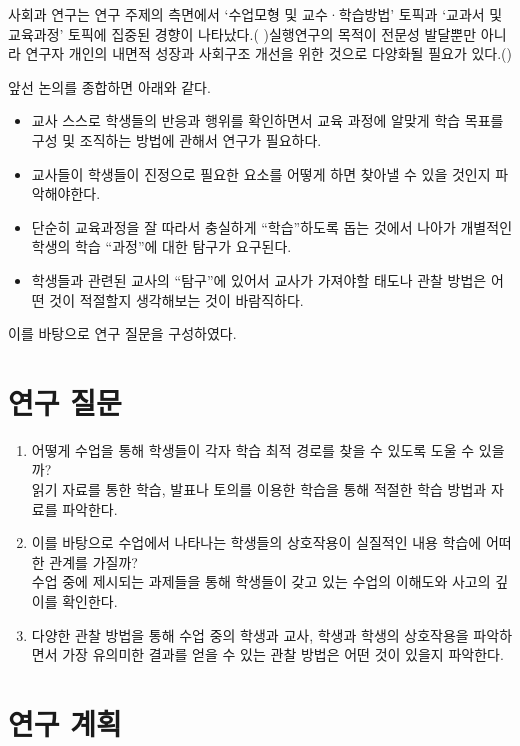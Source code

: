 \documentclass[10pt, a4paper, chapter]{oblivoir}
\begin{document}
    사회과 연구는 연구 주제의 측면에서 `수업모형 및 교수·학습방법’ 토픽과 `교과서 및 교육과정’ 토픽에
    집중된 경향이 나타났다.( \cite{김재우2019텍스트})실행연구의 목적이 전문성 발달뿐만 아니라 연구자 개인의 
    내면적 성장과 사회구조 개선을 위한 것으로 다양화될 필요가 있다.(\cite{강지영2011국내}) \newline

    \noindent
    앞선 논의를 종합하면 아래와 같다. 
    \begin{itemize}[$\ast$]
        \item 교사 스스로 학생들의 반응과 행위를 확인하면서 교육 과정에 알맞게 학습 목표를 구성 및 조직하는 방법에 관해서 연구가 필요하다.
        \item 교사들이 학생들이 진정으로 필요한 요소를 어떻게 하면 찾아낼 수 있을 것인지 파악해야한다. 
        \item 단순히 교육과정을 잘 따라서 충실하게 ``학습''하도록 돕는 것에서 나아가 개별적인 학생의 학습 ``과정''에 대한 탐구가 요구된다. 
        \item 학생들과 관련된 교사의 ``탐구''에 있어서 교사가 가져야할 태도나 관찰 방법은 어떤 것이 적절할지 생각해보는 것이 바람직하다. 
    \end{itemize}

    이를 바탕으로 연구 질문을 구성하였다. 


    \section{연구 질문}
    \begin{enumerate}
        \item 어떻게 수업을 통해 학생들이 각자 학습 최적 경로를 찾을 수 있도록 도울 수 있을까?  \\ 읽기 자료를 통한 학습, 발표나 토의를 이용한 학습을 통해 적절한 학습 방법과 자료를 파악한다. 
        \item  이를 바탕으로 수업에서 나타나는 학생들의 상호작용이 실질적인 내용 학습에 어떠한 관계를 가질까? \\  수업 중에 제시되는 과제들을 통해 학생들이 갖고 있는 수업의 이해도와 사고의 깊이를 확인한다. 
        \item 다양한 관찰 방법을 통해 수업 중의 학생과 교사, 학생과 학생의 상호작용을 파악하면서 가장 유의미한 결과를 얻을 수 있는 관찰 방법은 어떤 것이 있을지 파악한다. 
    \end{enumerate}

    \section{연구 계획}
\end{document}
